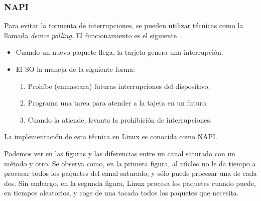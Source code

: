 \subsubsection{NAPI}
Para evitar la tormenta de interrupciones, se pueden utilizar técnicas como la llamada \emph{device polling}. El 
funcionamiento es el siguiente \cite{beyondDevicePolling}.
\begin{itemize}
 \item Cuando un nuevo paquete llega, la tarjeta genera una interrupción.
 \item El \gls{SO} la maneja de la siguiente forma:
 \begin{enumerate}
  \item Prohíbe (enmascara) futuras interrupciones del dispositivo.
  \item Programa una tarea para atender a la tajeta en un futuro.
  \item Cuando la atiende, levanta la prohibición de interrupciones.
 \end{enumerate}
\end{itemize}

La implementación de esta técnica en Linux es conocida como \gls{NAPI}.

Podemos ver en las figuras  y  las diferencias entre un canal saturado 
con un método y otro. Se observa como, en la primera figura, al núcleo no le da tiempo a procesar todos los paquetes 
del canal saturado, y sólo puede procesar una de cada dos. Sin embargo, en la segunda figura, Linux procesa los 
paquetes cuando puede, en tiempos aleatorios, y coge de una tacada todos los paquetes que necesita.

